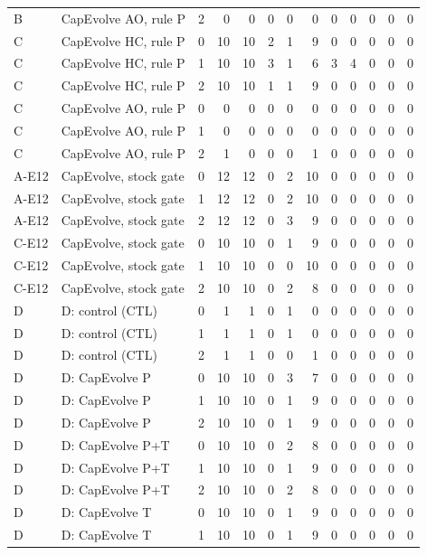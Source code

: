 \begin{table}[t]
{\begin{tabular}{@{}llrrrrrrrrrrr@{}}
B & CapEvolve AO, rule P & 2 & 0 & 0 & 0 & 0 & 0 & 0 & 0 & 0 & 0 & 0 \\
C & CapEvolve HC, rule P & 0 & 10 & 10 & 2 & 1 & 9 & 0 & 0 & 0 & 0 & 0 \\
C & CapEvolve HC, rule P & 1 & 10 & 10 & 3 & 1 & 6 & 3 & 4 & 0 & 0 & 0 \\
C & CapEvolve HC, rule P & 2 & 10 & 10 & 1 & 1 & 9 & 0 & 0 & 0 & 0 & 0 \\
C & CapEvolve AO, rule P & 0 & 0 & 0 & 0 & 0 & 0 & 0 & 0 & 0 & 0 & 0 \\
C & CapEvolve AO, rule P & 1 & 0 & 0 & 0 & 0 & 0 & 0 & 0 & 0 & 0 & 0 \\
C & CapEvolve AO, rule P & 2 & 1 & 0 & 0 & 0 & 1 & 0 & 0 & 0 & 0 & 0 \\
A-E12 & CapEvolve, stock gate & 0 & 12 & 12 & 0 & 2 & 10 & 0 & 0 & 0 & 0 & 0 \\
A-E12 & CapEvolve, stock gate & 1 & 12 & 12 & 0 & 2 & 10 & 0 & 0 & 0 & 0 & 0 \\
A-E12 & CapEvolve, stock gate & 2 & 12 & 12 & 0 & 3 & 9 & 0 & 0 & 0 & 0 & 0 \\
C-E12 & CapEvolve, stock gate & 0 & 10 & 10 & 0 & 1 & 9 & 0 & 0 & 0 & 0 & 0 \\
C-E12 & CapEvolve, stock gate & 1 & 10 & 10 & 0 & 0 & 10 & 0 & 0 & 0 & 0 & 0 \\
C-E12 & CapEvolve, stock gate & 2 & 10 & 10 & 0 & 2 & 8 & 0 & 0 & 0 & 0 & 0 \\
D & D: control (CTL) & 0 & 1 & 1 & 0 & 1 & 0 & 0 & 0 & 0 & 0 & 0 \\
D & D: control (CTL) & 1 & 1 & 1 & 0 & 1 & 0 & 0 & 0 & 0 & 0 & 0 \\
D & D: control (CTL) & 2 & 1 & 1 & 0 & 0 & 1 & 0 & 0 & 0 & 0 & 0 \\
D & D: CapEvolve P & 0 & 10 & 10 & 0 & 3 & 7 & 0 & 0 & 0 & 0 & 0 \\
D & D: CapEvolve P & 1 & 10 & 10 & 0 & 1 & 9 & 0 & 0 & 0 & 0 & 0 \\
D & D: CapEvolve P & 2 & 10 & 10 & 0 & 1 & 9 & 0 & 0 & 0 & 0 & 0 \\
D & D: CapEvolve P+T & 0 & 10 & 10 & 0 & 2 & 8 & 0 & 0 & 0 & 0 & 0 \\
D & D: CapEvolve P+T & 1 & 10 & 10 & 0 & 1 & 9 & 0 & 0 & 0 & 0 & 0 \\
D & D: CapEvolve P+T & 2 & 10 & 10 & 0 & 2 & 8 & 0 & 0 & 0 & 0 & 0 \\
D & D: CapEvolve T & 0 & 10 & 10 & 0 & 1 & 9 & 0 & 0 & 0 & 0 & 0 \\
D & D: CapEvolve T & 1 & 10 & 10 & 0 & 1 & 9 & 0 & 0 & 0 & 0 & 0 \\

\end{tabular}}
\end{table}
